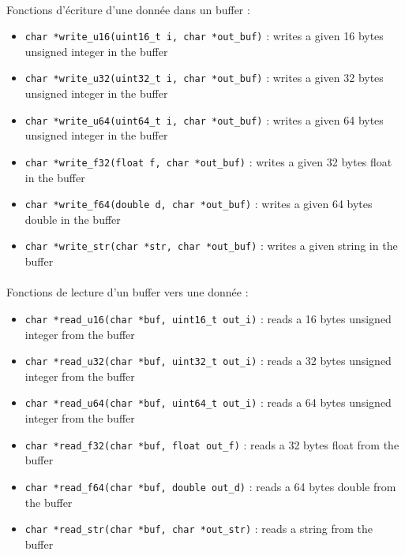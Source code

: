 \documentclass{article}
\begin{document}
    \paragraph{}
    Fonctions d'écriture d'une donnée dans un buffer :
    \begin{itemize}
        \item \texttt{char *write\_u16(uint16\_t i, char *out\_buf)} : writes a given 16 bytes unsigned integer in the buffer
        \item \texttt{char *write\_u32(uint32\_t i, char *out\_buf)} : writes a given 32 bytes unsigned integer in the buffer
        \item \texttt{char *write\_u64(uint64\_t i, char *out\_buf)} : writes a given 64 bytes unsigned integer in the buffer
        \item \texttt{char *write\_f32(float f, char *out\_buf)} : writes a given 32 bytes float in the buffer
        \item \texttt{char *write\_f64(double d, char *out\_buf)} : writes a given 64 bytes double in the buffer
        \item \texttt{char *write\_str(char *str, char *out\_buf)} : writes a given string in the buffer
    \end{itemize}

    \paragraph{}
    Fonctions de lecture d'un buffer vers une donnée :
    \begin{itemize}
        \item \texttt{char *read\_u16(char *buf, uint16\_t out\_i)} : reads a 16 bytes unsigned integer from the buffer
        \item \texttt{char *read\_u32(char *buf, uint32\_t out\_i)} : reads a 32 bytes unsigned integer from the buffer
        \item \texttt{char *read\_u64(char *buf, uint64\_t out\_i)} : reads a 64 bytes unsigned integer from the buffer
        \item \texttt{char *read\_f32(char *buf, float out\_f)} : reads a 32 bytes float from the buffer
        \item \texttt{char *read\_f64(char *buf, double out\_d)} : reads a 64 bytes double from the buffer
        \item \texttt{char *read\_str(char *buf, char *out\_str)} : reads a string from the buffer
    \end{itemize}
\end{document}
